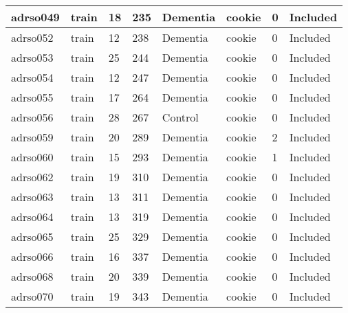 \begin{center}
\begin{longtable}{|l|l|l|l|l|l|l|l|}
adrso049  & train            & 18           & 235         & Dementia             & cookie          & 0                & Included      \\ \hline
adrso052  & train            & 12           & 238         & Dementia             & cookie          & 0                & Included      \\ \hline
adrso053  & train            & 25           & 244         & Dementia             & cookie          & 0                & Included      \\ \hline
adrso054  & train            & 12           & 247         & Dementia             & cookie          & 0                & Included      \\ \hline
adrso055  & train            & 17           & 264         & Dementia             & cookie          & 0                & Included      \\ \hline
adrso056  & train            & 28           & 267         & Control              & cookie          & 0                & Included      \\ \hline
adrso059  & train            & 20           & 289         & Dementia             & cookie          & 2                & Included      \\ \hline
adrso060  & train            & 15           & 293         & Dementia             & cookie          & 1                & Included      \\ \hline
adrso062  & train            & 19           & 310         & Dementia             & cookie          & 0                & Included      \\ \hline
adrso063  & train            & 13           & 311         & Dementia             & cookie          & 0                & Included      \\ \hline
adrso064  & train            & 13           & 319         & Dementia             & cookie          & 0                & Included      \\ \hline
adrso065  & train            & 25           & 329         & Dementia             & cookie          & 0                & Included      \\ \hline
adrso066  & train            & 16           & 337         & Dementia             & cookie          & 0                & Included      \\ \hline
adrso068  & train            & 20           & 339         & Dementia             & cookie          & 0                & Included      \\ \hline
adrso070  & train            & 19           & 343         & Dementia             & cookie          & 0                & Included      \\ \hline

\end{longtable}
\end{center}
